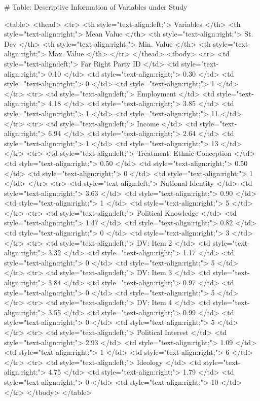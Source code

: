 # Table: Descriptive Information of Variables under Study 

<table>
 <thead>
  <tr>
   <th style="text-align:left;"> Variables </th>
   <th style="text-align:right;"> Mean Value </th>
   <th style="text-align:right;"> St. Dev </th>
   <th style="text-align:right;"> Min. Value </th>
   <th style="text-align:right;"> Max. Value </th>
  </tr>
 </thead>
<tbody>
  <tr>
   <td style="text-align:left;"> Far Right Party ID </td>
   <td style="text-align:right;"> 0.10 </td>
   <td style="text-align:right;"> 0.30 </td>
   <td style="text-align:right;"> 0 </td>
   <td style="text-align:right;"> 1 </td>
  </tr>
  <tr>
   <td style="text-align:left;"> Employment </td>
   <td style="text-align:right;"> 4.18 </td>
   <td style="text-align:right;"> 3.85 </td>
   <td style="text-align:right;"> 1 </td>
   <td style="text-align:right;"> 11 </td>
  </tr>
  <tr>
   <td style="text-align:left;"> Income </td>
   <td style="text-align:right;"> 6.94 </td>
   <td style="text-align:right;"> 2.64 </td>
   <td style="text-align:right;"> 1 </td>
   <td style="text-align:right;"> 13 </td>
  </tr>
  <tr>
   <td style="text-align:left;"> Treatment: Ethnic Conception </td>
   <td style="text-align:right;"> 0.50 </td>
   <td style="text-align:right;"> 0.50 </td>
   <td style="text-align:right;"> 0 </td>
   <td style="text-align:right;"> 1 </td>
  </tr>
  <tr>
   <td style="text-align:left;"> National Identity </td>
   <td style="text-align:right;"> 3.63 </td>
   <td style="text-align:right;"> 0.90 </td>
   <td style="text-align:right;"> 1 </td>
   <td style="text-align:right;"> 5 </td>
  </tr>
  <tr>
   <td style="text-align:left;"> Political Knowledge </td>
   <td style="text-align:right;"> 1.47 </td>
   <td style="text-align:right;"> 0.82 </td>
   <td style="text-align:right;"> 0 </td>
   <td style="text-align:right;"> 3 </td>
  </tr>
  <tr>
   <td style="text-align:left;"> DV: Item 2 </td>
   <td style="text-align:right;"> 3.32 </td>
   <td style="text-align:right;"> 1.17 </td>
   <td style="text-align:right;"> 0 </td>
   <td style="text-align:right;"> 5 </td>
  </tr>
  <tr>
   <td style="text-align:left;"> DV: Item 3 </td>
   <td style="text-align:right;"> 3.84 </td>
   <td style="text-align:right;"> 0.97 </td>
   <td style="text-align:right;"> 0 </td>
   <td style="text-align:right;"> 5 </td>
  </tr>
  <tr>
   <td style="text-align:left;"> DV: Item 4 </td>
   <td style="text-align:right;"> 3.55 </td>
   <td style="text-align:right;"> 0.99 </td>
   <td style="text-align:right;"> 0 </td>
   <td style="text-align:right;"> 5 </td>
  </tr>
  <tr>
   <td style="text-align:left;"> Political Interest </td>
   <td style="text-align:right;"> 2.93 </td>
   <td style="text-align:right;"> 1.09 </td>
   <td style="text-align:right;"> 1 </td>
   <td style="text-align:right;"> 6 </td>
  </tr>
  <tr>
   <td style="text-align:left;"> Ideology </td>
   <td style="text-align:right;"> 4.75 </td>
   <td style="text-align:right;"> 1.79 </td>
   <td style="text-align:right;"> 0 </td>
   <td style="text-align:right;"> 10 </td>
  </tr>
</tbody>
</table>
